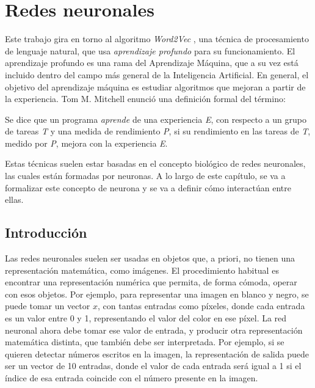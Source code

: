 \chapter{Redes neuronales}

Este trabajo gira en torno al algoritmo \textit{Word2Vec} \cite{word2vec:1} \cite{word2vec:2}, una técnica de procesamiento
de lenguaje natural, que usa \textit{aprendizaje profundo} para su funcionamiento. El aprendizaje
profundo es una rama del Aprendizaje Máquina, que a su vez está incluido dentro del campo más general
de la Inteligencia Artificial. En general, el objetivo del aprendizaje máquina es estudiar algoritmos
que mejoran a partir de la experiencia. Tom M. Mitchell \cite{mitchell1997} enunció una definición formal
del término:

\begin{definition}
    Se dice que un programa \textit{aprende} de una experiencia \textit{E}, con respecto a un grupo
    de tareas \textit{T} y una medida de rendimiento \textit{P}, si su rendimiento en las tareas de
    \textit{T}, medido por \textit{P}, mejora con la experiencia \textit{E}.
\end{definition}

Estas técnicas suelen estar basadas en el concepto biológico de redes neuronales, las cuales están formadas por neuronas. A lo largo de este capítulo, se va a formalizar este concepto de neurona y se va a definir cómo interactúan entre ellas.

\section{Introducción}

Las redes neuronales suelen ser usadas en objetos que, a priori, no tienen una representación matemática,
como imágenes. El procedimiento habitual es encontrar una representación numérica que permita, de forma
cómoda, operar con esos objetos. Por ejemplo, para representar una imagen en blanco y negro, se puede
tomar un vector $x$, con tantas entradas como píxeles, donde cada entrada es un valor entre 0 y 1,
representando el valor del color en ese píxel. La red neuronal ahora debe tomar ese valor de entrada,
y producir otra representación matemática distinta, que también debe ser interpretada. Por ejemplo,
si se quieren detectar números escritos en la imagen, la representación de salida puede ser un vector
de 10 entradas, donde el valor de cada entrada será igual a 1 si el índice de esa entrada coincide con
el número presente en la imagen.

